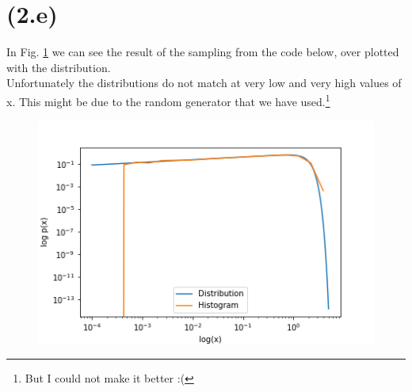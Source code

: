 \section{(2.e)}
In Fig. \ref{fig:fig4} we can see the result of the sampling from the code below, over plotted with the distribution.\\
Unfortunately the distributions do not match at very low and very high values of x. This might be due to the random generator that we have used.\footnote{But I could not make it better :(}



\begin{figure}[!htb]
  \centering
  \includegraphics[width=0.7\linewidth]{Plots/hist_2e.png}
  \caption{}
  \label{fig:fig4}
\end{figure}